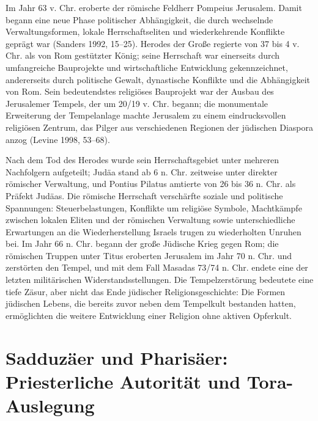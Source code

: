 \documentclass[fontsize=12pt]{mybib}
\begin{document}
Im Jahr 63 v. Chr. eroberte der römische Feldherr Pompeius Jerusalem. Damit begann eine neue Phase politischer Abhängigkeit, die durch wechselnde Verwaltungsformen, lokale Herrschaftseliten und wiederkehrende Konflikte geprägt war (Sanders 1992, 15–25). Herodes der Große regierte von 37 bis 4 v. Chr. als von Rom gestützter König; seine Herrschaft war einerseits durch umfangreiche Bauprojekte und wirtschaftliche Entwicklung gekennzeichnet, andererseits durch politische Gewalt, dynastische Konflikte und die Abhängigkeit von Rom. Sein bedeutendstes religiöses Bauprojekt war der Ausbau des Jerusalemer Tempels, der um 20/19 v. Chr. begann; die monumentale Erweiterung der Tempelanlage machte Jerusalem zu einem eindrucksvollen religiösen Zentrum, das Pilger aus verschiedenen Regionen der jüdischen Diaspora anzog (Levine 1998, 53–68).

Nach dem Tod des Herodes wurde sein Herrschaftsgebiet unter mehreren Nachfolgern aufgeteilt; Judäa stand ab 6 n. Chr. zeitweise unter direkter römischer Verwaltung, und Pontius Pilatus amtierte von 26 bis 36 n. Chr. als Präfekt Judäas. Die römische Herrschaft verschärfte soziale und politische Spannungen: Steuerbelastungen, Konflikte um religiöse Symbole, Machtkämpfe zwischen lokalen Eliten und der römischen Verwaltung sowie unterschiedliche Erwartungen an die Wiederherstellung Israels trugen zu wiederholten Unruhen bei. Im Jahr 66 n. Chr. begann der große Jüdische Krieg gegen Rom; die römischen Truppen unter Titus eroberten Jerusalem im Jahr 70 n. Chr. und zerstörten den Tempel, und mit dem Fall Masadas 73/74 n. Chr. endete eine der letzten militärischen Widerstandsstellungen. Die Tempelzerstörung bedeutete eine tiefe Zäsur, aber nicht das Ende jüdischer Religionsgeschichte: Die Formen jüdischen Lebens, die bereits zuvor neben dem Tempelkult bestanden hatten, ermöglichten die weitere Entwicklung einer Religion ohne aktiven Opferkult.

\section{Sadduzäer und Pharisäer: Priesterliche Autorität und Tora-Auslegung}
\end{document}
